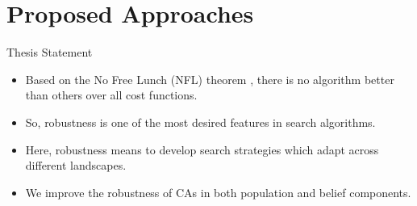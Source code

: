 \documentclass[table]{beamer}
\begin{document}
	\section{Proposed Approaches}
	
	\begin{frame}{Thesis Statement}
		\begin{block}{}
			\begin{itemize}
				\justifying
				\item Based on the No Free Lunch (NFL) theorem , there is no algorithm better than others over all cost functions.
				\item So, robustness is one of the most desired features in search algorithms.
				\item Here, robustness means to develop search strategies which adapt across different landscapes.
				\item We improve the robustness of CAs in both population and belief components.
			\end{itemize}
		\end{block}
	\end{frame}
		
	
\end{document}
